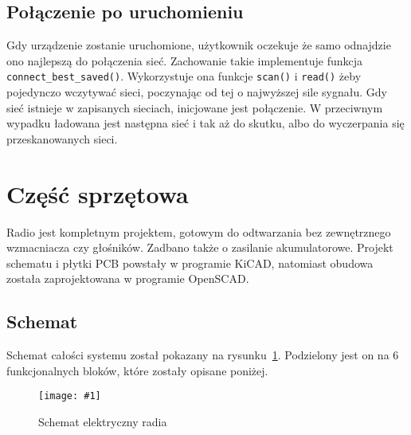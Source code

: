 \documentclass[polish]{aghengthesis}
\newcommand{\imgint}[4]{
	\begin{figure}[{#4}]
		\centering
		\texttt{[image: \#1]}
		\caption{#2}
		\label{#1}
	\end{figure}
}
\newcommand{\imgh}[3]{\imgint{#1}{#2}{#3}{H}}
\begin{document}
		\subsection{Połączenie po uruchomieniu}
			Gdy urządzenie zostanie uruchomione, użytkownik oczekuje że samo odnajdzie ono najlepszą do połączenia sieć. Zachowanie takie implementuje funkcja \lstinline|connect_best_saved()|. Wykorzystuje ona funkcje \lstinline|scan()| i \lstinline|read()| żeby pojedynczo wczytywać sieci, poczynając od tej o najwyższej sile sygnału. Gdy sieć istnieje w zapisanych sieciach, inicjowane jest połączenie. W przeciwnym wypadku ładowana jest następna sieć i tak aż do skutku, albo do wyczerpania się przeskanowanych sieci.
		
	\section{Część sprzętowa}
		\label{sec:hw}
		Radio jest kompletnym projektem, gotowym do odtwarzania bez zewnętrznego wzmacniacza czy głośników. Zadbano także o zasilanie akumulatorowe. Projekt schematu i płytki PCB powstały w programie KiCAD\textsuperscript{\cite{hw_kicad}}, natomiast obudowa została zaprojektowana w programie OpenSCAD\textsuperscript{\cite{hw_openscad}}.
	
		\subsection{Schemat}
			Schemat całości systemu został pokazany na rysunku~\ref{3/hw_kicad_sch}. Podzielony jest on na 6 funkcjonalnych bloków, które zostały opisane poniżej.
			
			\imgh{3/hw_kicad_sch}{Schemat elektryczny radia}{1}
			
\end{document}
